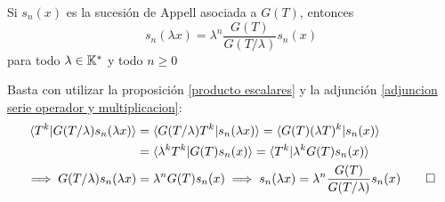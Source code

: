 \begin{teorema}[de multiplicación]\label{teorema de multiplicacion}
    Si $s_n(x)$ es la sucesión de Appell asociada a $G(T)$, entonces
    \begin{equation*}
        s_n(\lambda x) = \lambda^n \frac{G(T)}{G(T/\lambda)} s_n(x)
    \end{equation*}
    para todo $\lambda \in \mathbb{K}^*$ y todo $n \geq 0$
\end{teorema}

\begin{demo}
    Basta con utilizar la proposición \ref{producto escalares} y la adjunción \ref{adjuncion serie operador y multiplicacion}:
    \begin{align*}
        \langle T^k | G(T/\lambda)s_n(\lambda x) \rangle & = \langle G(T/\lambda) T^k | s_n(\lambda x) \rangle = \langle G(T) (\lambda T)^k | s_n(x) \rangle \\
        & = \langle \lambda^k T^k | G(T)s_n(x) \rangle = \langle T^k | \lambda^k G(T)s_n(x) \rangle\\
        \implies G(T/\lambda)s_n(\lambda x) & = \lambda^n G(T)s_n(x) \implies s_n(\lambda x) = \lambda^n \frac{G(T)}{G(T/\lambda)} s_n(x) \qedhere
    \end{align*}
\end{demo}

